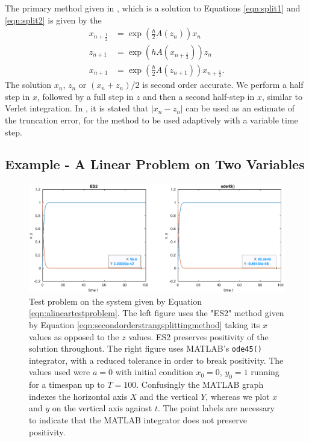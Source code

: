 The primary method given in \cite{blanes_pos_2022}, which is a solution to Equations \ref{eqn:split1} and \ref{eqn:split2} is given by the 
\begin{equation}
    \begin{aligned}
        x_{n+\frac{1}{2}} &= \exp \left( \frac{h}{2} A(z_n) \right) x_n \\
        z_{n+1} &= \exp \left( h A(x_{n+\frac{1}{2}}) \right) z_n \\
        x_{n+1} &= \exp \left( \frac{h}{2} A(z_{n+1}) \right) x_{n+\frac{1}{2}}.
    \end{aligned}
    \label{eqn:secondorderstrangsplittingmethod}
\end{equation}
The solution $x_n$, $z_n$ or $(x_n + z_n)/2$ is second order accurate. We perform a half step in $x$,
followed by a full step in $z$ and then a second half-step in $x$, similar to Verlet integration.
In \cite{blanes_pos_2022}, it is stated that $|x_n - z_n|$ can be used as an estimate of the truncation error, for the method to be used adaptively with a variable time step. 


\subsection{Example - A Linear Problem on Two Variables}

\begin{figure}
    \centering
    \includegraphics[width = \linewidth]{Matlab/linearproblempositivity.eps}
    \caption{
        Test problem on the system given by Equation \ref{eqn:alineartestproblem}.
        The left figure uses the "ES2" method given by Equation \ref{eqn:secondorderstrangsplittingmethod} taking its $x$ values as opposed to the $z$ values.
        ES2 preserves positivity of the solution throughout.
        The right figure uses MATLAB's \texttt{ode45()} integrator, with a reduced tolerance in order to break positivity.
        The values used were $a=0$ with initial condition $x_0 = 0$, $y_0 = 1$ running for a timespan up to $T = 100$.
        Confusingly the MATLAB graph indexes the horizontal axis $X$ and the vertical $Y$, whereas we plot $x$ and $y$ on the vertical axis against $t$.
        The point labels are necessary to indicate that the MATLAB integrator does not preserve positivity.
    }
    \label{fig:breakposlin}
\end{figure}

